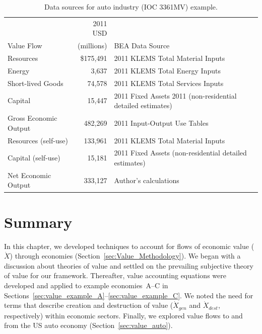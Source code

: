 \begin{table}
\caption[Data Sources for auto industry (IOC 3361MV) example]{Data sources for auto industry (IOC 3361MV) example.}
\begin{center}
  \begin{tabular}{l r @{\hspace{2em}} l}
   \toprule 
     & 2011 USD &   \\ 
Value Flow & (millions) & BEA Data Source \\
	\midrule
    Resources  & \$175,491           & 2011 KLEMS Total Material Inputs \\

   Energy &   3,637&   2011 KLEMS Total Energy Inputs                \\

    Short-lived Goods &   74,578 &   2011 KLEMS Total Services Inputs    \\
    Capital &  15,447  &  2011 Fixed Assets 2011 (non-residential detailed estimates)     \\  

    Gross Economic Output & 482,269  &   2011 Input-Output Use Tables \\

    Resources (self-use)  &  133,961 & 2011 KLEMS Total Material Inputs     \\
    Capital (self-use) & 15,181 & 2011 Fixed Assets (non-residential detailed estimates)      \\
    Net Economic Output & 333,127   &  Author's calculations \\
    \bottomrule
  \end{tabular}

\end{center}
\label{tab:data}
\end{table}


\section{Summary}
\label{sec:value_summary}

In this chapter, we developed techniques to account for flows of economic value
($\dot{X}$) through economies 
(Section~\ref{sec:Value_Methodology}).
We began with a discussion about theories of value and settled on
the prevailing subjective theory of value for our framework.
Thereafter, value accounting equations were developed and applied to example
economies~A--C %
in Sections~\ref{sec:value_example_A}--\ref{sec:value_example_C}. 
We noted the need for terms that describe creation and destruction
of value ($\dot{X}_{gen}$ and $\dot{X}_{dest}$, respectively) 
within economic sectors.
Finally, we explored value flows 
to and from the US auto economy (Section~\ref{sec:value_auto}).

